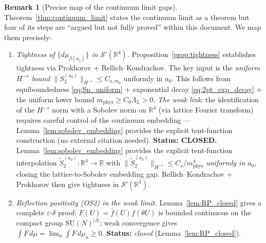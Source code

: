 \documentclass[11pt,a4paper]{amsart}
\theoremstyle{definition}
\newtheorem{remark}[theorem]{Remark}
\newcommand{\SU}{\mathrm{SU}}
\newcommand{\R}{\mathbb{R}}
\begin{document}
\begin{remark}[Precise map of the continuum limit gaps]
\label{rem:continuum_gap}
Theorem~\ref{thm:continuum_limit} states the continuum limit as a theorem
but four of its steps are ``argued but not fully proved'' within this document.
We map them precisely:

\begin{enumerate}[label=(C-\arabic*)]
\item \emph{Tightness of $\{d\mu_{\beta(a_j)}\}$ in $\mathcal{S}'(\R^4)$.}
      Proposition~\ref{prop:tightness} establishes tightness via Prokhorov +
      Rellich--Kondrachov.  The key input is the \emph{uniform $H^{-s}$ bound}
      $\|S_2^{(a_0)}\|_{H^{-s}} \le C_{s,m_0}$ uniformly in $a_0$.  This
      follows from equiboundedness \eqref{eq:Sn_uniform} + exponential decay
      \eqref{eq:2pt_exp_decay} + the uniform lower bound
      $m_{\mathrm{phys}} \ge C_0\Lambda_L > 0$.  \emph{The weak link}: the
      identification of the $H^{-s}$ norm with a Sobolev norm on $\R^4$ (via
      lattice Fourier transform) requires careful control of the continuum
      embedding — Lemma~\ref{lem:sobolev_embedding} provides the
      explicit tent-function construction (no external citation needed).
      \textbf{Status: CLOSED.}
      Lemma~\ref{lem:sobolev_embedding} provides the explicit tent-function
      interpolation $\widetilde{S}_2^{(a_0)} : \R^4\to\R$ with
      $\|\widetilde{S}_2^{(a_0)}\|_{H^{-s}} \le C_s/m_{\mathrm{phys}}^4$
      \emph{uniformly in $a_0$}, closing the lattice-to-Sobolev embedding gap.
      Rellich--Kondrachov + Prokhorov then give tightness in $\mathcal{S}'(\R^4)$.

\item \emph{Reflection positivity (OS2) in the weak limit.}
      Lemma~\ref{lem:RP_closed} gives a complete $\varepsilon$-$\delta$ proof:
      $F(U) = \bar f(U) f(\theta U)$ is bounded continuous on the compact group
      $\SU(N)^{|\Lambda|}$; weak convergence gives $\int F\,d\mu = \lim_n \int F\,d\mu_n \ge 0$.
      \textbf{Status:} \emph{closed} (Lemma~\ref{lem:RP_closed}).


\end{enumerate}
\end{remark}
\end{document}
